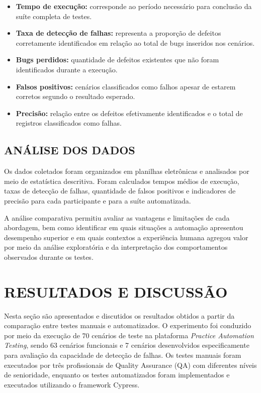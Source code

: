 \documentclass{UNESC}
\begin{document}
\begin{itemize}
  \item \textbf{Tempo de execução:} corresponde ao período necessário para conclusão da suíte completa de testes.
  \item \textbf{Taxa de detecção de falhas:} representa a proporção de defeitos corretamente identificados em relação ao total de bugs inseridos nos cenários.
  \item \textbf{Bugs perdidos:} quantidade de defeitos existentes que não foram identificados durante a execução.
  \item \textbf{Falsos positivos:} cenários classificados como falhos apesar de estarem corretos segundo o resultado esperado.
  \item \textbf{Precisão:} relação entre os defeitos efetivamente identificados e o total de registros classificados como falhas.
\end{itemize}

\subsection{ANÁLISE DOS DADOS}

Os dados coletados foram organizados em planilhas eletrônicas e analisados por meio de estatística descritiva. Foram calculados tempos médios de execução, taxas de detecção de falhas, quantidade de falsos positivos e indicadores de precisão para cada participante e para a suíte automatizada.

A análise comparativa permitiu avaliar as vantagens e limitações de cada abordagem, bem como identificar em quais situações a automação apresentou desempenho superior e em quais contextos a experiência humana agregou valor por meio da análise exploratória e da interpretação dos comportamentos observados durante os testes.

\section{RESULTADOS E DISCUSSÃO}
Nesta seção são apresentados e discutidos os resultados obtidos a partir da comparação entre testes manuais e automatizados. O experimento foi conduzido por meio da execução de 70 cenários de teste na plataforma \textit{Practice Automation Testing}, sendo 63 cenários funcionais e 7 cenários desenvolvidos especificamente para avaliação da capacidade de detecção de falhas. Os testes manuais foram executados por três profissionais de Quality Assurance (QA) com diferentes níveis de senioridade, enquanto os testes automatizados foram implementados e executados utilizando o framework Cypress.
\end{document}
